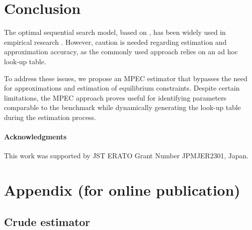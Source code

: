 \documentclass[12pt]{article}
\begin{document}
\section{Conclusion}

The optimal sequential search model, based on \cite{weitzman1979optimal}, has been widely used in empirical research \citep{ursu2023sequential}. However, caution is needed regarding estimation and approximation accuracy, as the commonly used approach relies on an ad hoc look-up table.

To address these issues, we propose an MPEC estimator that bypasses the need for approximations and estimation of equilibrium constraints. Despite certain limitations, the MPEC approach proves useful for identifying parameters comparable to the benchmark while dynamically generating the look-up table during the estimation process.

\paragraph{Acknowledgments}
This work was supported by JST ERATO Grant Number JPMJER2301, Japan.




\newpage
\appendix
\section{Appendix (for online publication)}

\subsection{Crude estimator}
\end{document}
